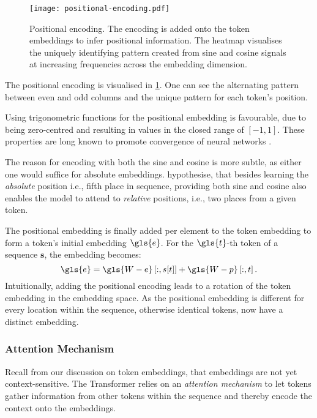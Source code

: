 \begin{figure}[ht]
    \centering
    \texttt{[image: positional-encoding.pdf]}
    \caption[Positional Encoding of Transformer]{Positional encoding. The encoding is added onto the \gls{token} embeddings to infer positional information. The heatmap visualises the uniquely identifying pattern created from sine and cosine signals at increasing frequencies across the embedding dimension.}
    \label{fig:positional-embedding}
\end{figure}

The positional encoding is visualised in \cref{fig:positional-embedding}. One can see the alternating pattern between even and odd columns and the unique pattern for each \gls{token}'s position.

Using trigonometric functions for the positional embedding is favourable, due to being zero-centred and resulting in values in the closed range of $[-1,1]$. These properties are long known to promote convergence of neural networks \autocites[][8-9]{lecunEfficientBackProp2012}[][2]{ioffeBatchNormalizationAccelerating2015}.

The reason for encoding with both the sine and cosine is more subtle, as either one would suffice for absolute embeddings. \textcite[][6]{vaswaniAttentionAllYou2017} hypothesise, that besides learning the \emph{absolute} position i.e., fifth place in sequence, providing both sine and cosine also enables the model to attend to \emph{relative} positions, i.e., two places from a given \gls{token}.

The positional embedding is finally added per element to the token embedding to form a \gls{token}'s initial embedding $\gls{e}$. For the $\gls{t}$-th \gls{token} of a sequence $\mathbf{s}$, the embedding becomes:
\begin{equation}
    \gls{e}=\gls{W-e}\left[:, s[t]\right]+\gls{W-p}\left[:, t\right].
    \label{eq:positional-embedding}
\end{equation}
Intuitionally, adding the positional encoding leads to a rotation of the \gls{token} embedding in the embedding space. As the positional embedding is different for every location within the sequence, otherwise identical \glspl{token}, now have a distinct embedding.

\subsubsection{Attention Mechanism}\label{sec:attention}

Recall from our discussion on token embeddings, that embeddings are not yet context-sensitive. The Transformer relies on an \emph{attention mechanism} to let tokens gather information from other tokens within the sequence and thereby encode the context onto the embeddings.

